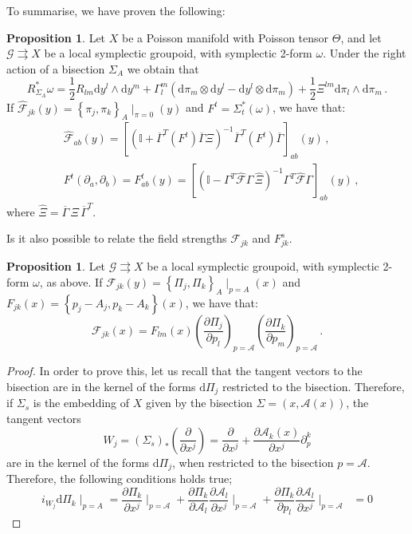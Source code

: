 \documentclass[12pt,a4paper]{article}
\numberwithin{equation}{section}
\theoremstyle{definition}
\newtheorem{proposition}[equation]{Proposition}
\newcommand{\cG}{\mathcal{G}}
\newcommand{\dd}{\mathrm{d}}
\newcommand{\be}{\begin{equation}}
\newcommand{\ee}{\end{equation}}
\begin{document}
{To summarise, we have proven the following:
\begin{proposition}
Let $X$ be a Poisson manifold with Poisson tensor $\Theta$, and let $\cG\rightrightarrows X$ be a local symplectic groupoid, with symplectic 2-form $\omega$. Under the right action of a bisection $\Sigma_A$ we obtain that
\[
R_{\Sigma_A}^*\omega = \frac{1}{2} R_{lm}\dd y^l\wedge \dd y^m + \Gamma_l^m \left( \dd \pi_m \otimes \dd y^l - \dd y^l \otimes \dd \pi_m \right) + \frac{1}{2} \Xi^{lm}\dd \pi_l \wedge \dd \pi_m\,.
\]
If $\widehat{\mathcal{F}}_{jk}(y)=\left\lbrace \pi_j,\pi_k \right\rbrace_A\mid_{\pi=0}(y)$ and $F^t=\Sigma_t^*(\omega)$, we have that:
\begin{eqnarray}
    &\widehat{\mathcal{F}}_{ab}(y) = \left[ \left( \mathbb{I} +  \overline{\Gamma}^T(F^t)\overline{\Gamma} \Xi \right)^{-1} \overline{\Gamma}^T(F^t)\overline{\Gamma} \right]_{ab}(y)\,,\\
    &F^t(\partial_a,\partial_b)=F^{t}_{ab}(y) =  \left[ (\mathbb{I} - \Gamma^T \widehat{\mathcal{F}}\Gamma\,\widehat{\Xi})^{-1} \Gamma^T\widehat{\mathcal{F}}\Gamma \right]_{ab}(y) \,,
\end{eqnarray}
where $\widehat{\Xi} = \overline{\Gamma}\,\Xi \, \overline{\Gamma}^T$.
\end{proposition}


Is it also possible to relate the field strengths $\mathcal{F}_{jk}$ and $F^s_{jk}$. 
\begin{proposition}
Let $\cG\rightrightarrows X$ be a local symplectic groupoid, with symplectic 2-form $\omega$, as above. 
If ${\mathcal{F}}_{jk}(y)=\left\lbrace \Pi_j,\Pi_k \right\rbrace_A\mid_{p=A}(x)$ and $F_{jk}(x)=\left\lbrace p_j-A_j,p_k-A_k \right\rbrace (x)$, we have that:
\begin{equation}
\mathcal{F}_{jk}(x) = F_{lm}(x) \left( \frac{\partial \Pi_j}{\partial p_l}\right)_{p=\mathcal{A}} \left( \frac{\partial \Pi_k}{\partial p_m} \right)_{p=\mathcal{A}}\,.    
\end{equation}
\end{proposition}
\begin{proof}
In order to prove this, let us recall that the tangent vectors to the bisection are in the kernel of the forms $\dd \Pi_{j}$ restricted to the bisection. Therefore, if $\Sigma_s$ is the embedding of $X$ given by the bisection $\Sigma=(x,\mathcal{A}(x))$, the tangent vectors 
\be
W_j = (\Sigma_s)_*\left( \frac{\partial}{\partial x^j} \right) = \frac{\partial}{\partial x^j} + \frac{\partial \mathcal{A}_k(x)}{\partial x^j}\partial_p^k
\ee
are in the kernel of the forms $\dd \Pi_j$, when restricted to the bisection $p=\mathcal{A}$. Therefore, the following conditions holds true;
\begin{equation}\label{eq.kernel}
i_{W_j}\dd \Pi_k\mid_{p=A} = \frac{\partial \Pi_k}{\partial x^{j}} \mid_{p=\mathcal{A}} + \frac{\partial \Pi_k}{\partial \mathcal{A}_{l}}\frac{\partial \mathcal{A}_l}{\partial x^{j}}\mid_{p=\mathcal{A}} + \frac{\partial \Pi_k}{\partial p_{l}}\frac{\partial \mathcal{A}_l}{\partial x^{j}}\mid_{p=\mathcal{A}} \;\;= 0
\end{equation}


\end{proof}}
\end{document}
